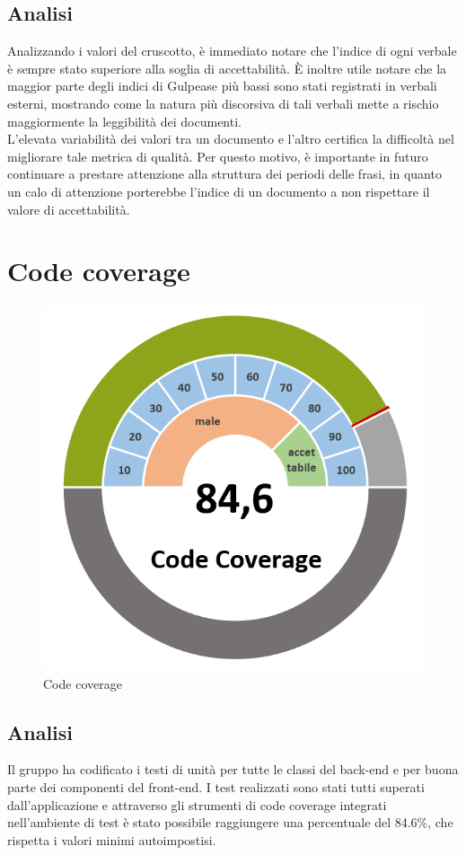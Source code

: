 \subsection{Analisi}
Analizzando i valori del cruscotto, è immediato notare che l'indice di ogni verbale è sempre stato superiore alla soglia di accettabilità. È inoltre utile notare che la maggior parte degli indici di Gulpease più bassi sono stati registrati in verbali esterni, mostrando come la natura più discorsiva di tali verbali mette a rischio maggiormente la leggibilità dei documenti.\\
L'elevata variabilità dei valori tra un documento e l'altro certifica la difficoltà nel migliorare tale metrica di qualità. Per questo motivo, è importante in futuro continuare a prestare attenzione alla struttura dei periodi delle frasi, in quanto un calo di attenzione porterebbe l'indice di un documento a non rispettare il valore di accettabilità.

\section{Code coverage}
\begin{figure}[H]
    \centering
    \includegraphics[width=0.45\linewidth]{codecoverage.png}
    \caption{Code coverage}
\end{figure}
\subsection{Analisi}
Il gruppo ha codificato i testi di unità per tutte le classi del back-end e per buona parte dei componenti del front-end. I test realizzati sono stati tutti superati dall'applicazione e attraverso gli strumenti di code coverage integrati nell'ambiente di test è stato possibile raggiungere una percentuale del 84.6\%, che rispetta i valori minimi autoimpostisi. 